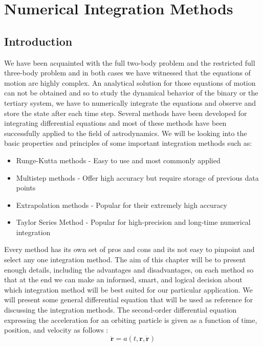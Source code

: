 \chapter{Numerical Integration Methods}
\label{integ}
\graphicspath{{chapter-6/Images/}}

\section{Introduction}
We have been acquainted with the full two-body problem and the restricted full three-body problem and in both cases we have witnessed that the equations of motion are highly complex. An analytical solution for those equations of motion can not be obtained and so to study the dynamical behavior of the binary or the tertiary system, we have to numerically integrate the equations and observe and store the state after each time step. Several methods have been developed for integrating differential equations and most of these methods have been successfully applied to the field of astrodynamics. We will be looking into the basic properties and principles of some important integration methods such as:
\begin{itemize}
\item Runge-Kutta methods - Easy to use and most commonly applied \cite{gillbook}
\item Multistep methods - Offer high accuracy but require storage of previous data points \cite{gillbook}
\item Extrapolation methods - Popular for their extremely high accuracy \cite{gillbook}
\item Taylor Series Method - Popular for high-precision and long-time numerical integration \cite{tsm2011}
\end{itemize}
Every method has its own set of pros and cons and its not easy to pinpoint and select any one integration method. The aim of this chapter will be to present enough details, including the advantages and disadvantages, on each method so that at the end we can make an informed, smart, and logical decision about which integration method will be best suited for our particular application. We will present some general differential equation that will be used as reference for discussing the integration methods. The second-order differential equation expressing the acceleration for an orbiting particle is given as a function of time, position, and velocity as follows \cite{gillbook}:
\begin{equation}
\label{racc}
\ddot{\mathbf{r}} = a(t, \mathbf{r}, \dot{\mathbf{r}})
\end{equation}
